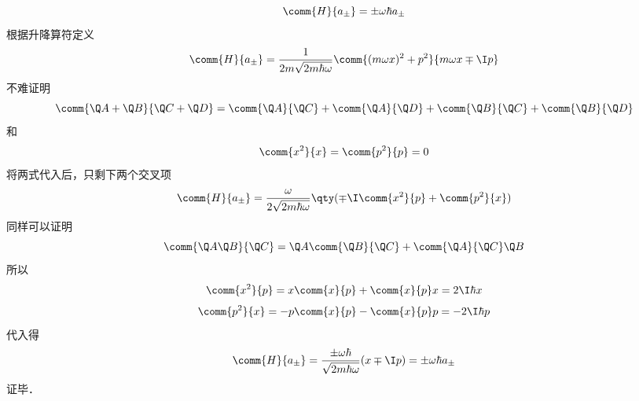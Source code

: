 \begin{equation}
\comm{H}{a_\pm} =  \pm \omega\hbar a_\pm
\end{equation}
根据升降算符定义
\begin{equation}
\comm{H}{a_\pm} = \frac{1}{2m\sqrt{2m\hbar \omega}} \comm{(m\omega x)^2 + p^2}{m\omega x \mp \I p}
\end{equation}
不难证明
\begin{equation}
\comm{\Q A + \Q B}{\Q C + \Q D} = \comm{\Q A}{\Q C} + \comm{\Q A}{\Q D} + \comm{\Q B}{\Q C} + \comm{\Q B}{\Q D}
\end{equation}
和
\begin{equation}
\comm{x^2}{x} = \comm{p^2}{p} = 0
\end{equation}
将两式代入后，只剩下两个交叉项
\begin{equation}
\comm{H}{a_\pm} = \frac{\omega}{2\sqrt{2m\hbar \omega}} \qty(\mp \I \comm{x^2}{p} + \comm{p^2}{x})
\end{equation}
同样可以证明
\begin{equation}
\comm{\Q A\Q B}{\Q C} = \Q A \comm{\Q B}{\Q C} + \comm{\Q A}{\Q C}\Q B
\end{equation}
所以
\begin{equation}
\comm{x^2}{p} = x\comm{x}{p} + \comm{x}{p} x = 2\I\hbar  x
\end{equation}
\begin{equation}
\comm{p^2}{x} =  -  p\comm{x}{p} - \comm{x}{p} p =  - 2\I\hbar  p
\end{equation}
代入得
\begin{equation}
\comm{H}{a_\pm} = \frac{\pm\omega\hbar}{\sqrt{2m\hbar\omega}} (x \mp \I p) =  \pm \omega\hbar a_ \pm
\end{equation}
证毕．
